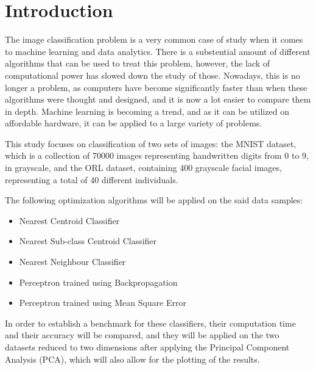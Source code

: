 \section{Introduction}
  The image classification problem is a very common case of study when it comes to machine learning and data analytics. There is a substential amount of different algorithms that can be used to treat this problem, however, the lack of computational power has slowed down the study of those. Nowadays, this is no longer a problem, as computers have become significantly faster than when these algorithms were thought and designed, and it is now a lot easier to compare them in depth. Machine learning is becoming a trend, and as it can be utilized on affordable hardware, it can be applied to a large variety of problems.
  
 This study focuses on classification of two sets of images: the MNIST dataset, which is a collection of 70000 images representing handwritten digits from 0 to 9, in grayscale, and the ORL dataset, containing 400 grayscale facial images, representing a total of 40 different individuals.

The following optimization algorithms will be applied on the said data samples:
\begin{itemize}
  \item Nearest Centroid Classifier
  \item Nearest Sub-class Centroid Classifier
  \item Nearest Neighbour Classifier
  \item Perceptron trained using Backpropagation
  \item Perceptron trained using Mean Square Error
\end{itemize}

In order to establish a benchmark for these classifiers, their computation time and their accuracy will be compared, and they will be applied on the two datasets reduced to two dimensions after applying the Principal Component Analysis (PCA), which will also allow for the plotting of the results.


